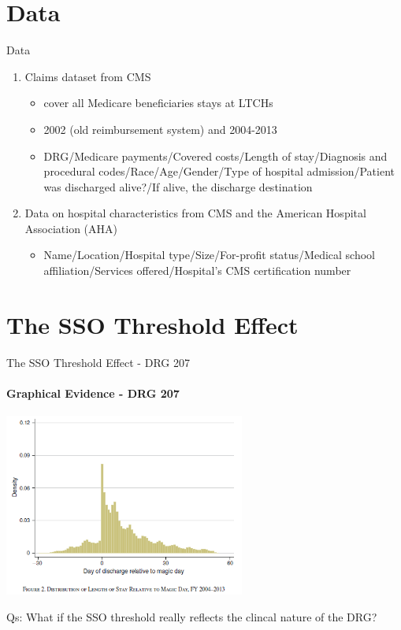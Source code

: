 \documentclass{beamer}
\begin{document}
\section{Data}
\begin{frame}{Data}
\begin{enumerate}
\item Claims dataset from CMS
		\begin{itemize}
		\item cover all Medicare beneficiaries stays at LTCHs
		\item 2002 (old reimbursement system) and 2004-2013
		\item DRG/Medicare payments/Covered costs/Length of stay/Diagnosis and procedural
codes/Race/Age/Gender/Type of hospital admission/Patient was discharged alive?/If alive, the discharge destination
		\end{itemize}
\item Data on hospital characteristics from CMS and the American Hospital Association (AHA)
		\begin{itemize}
		\item Name/Location/Hospital type/Size/For-profit status/Medical
			school affiliation/Services offered/\color{teal}Hospital's CMS certification number
		\end{itemize}
\end{enumerate}
\end{frame}

\section{The SSO Threshold Effect}
\begin{frame}{The SSO Threshold Effect - DRG 207}
\framesubtitle{Graphical Evidence - DRG 207}
\begin{center}
\includegraphics[height=6cm]{graph_evi_grouped}
\end{center}
Qs: What if the SSO threshold really reflects the clincal nature of the DRG?
\end{frame}
\end{document}
